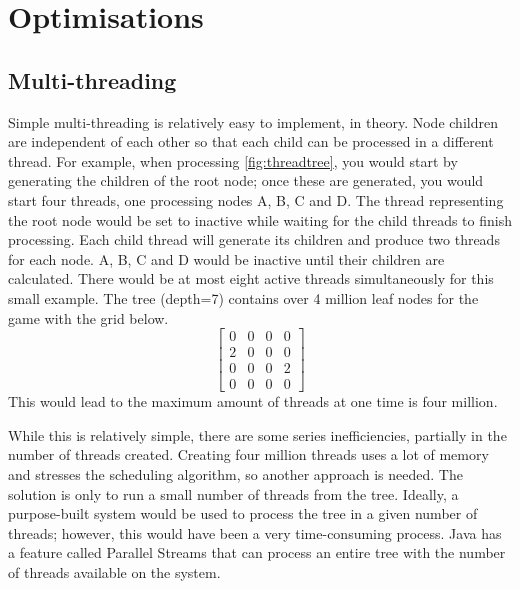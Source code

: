 \documentclass{article}
\begin{document}
\newpage
\section{Optimisations}  
\subsection{Multi-threading}
Simple multi-threading is relatively easy to implement, in theory. Node children are independent of each other so that each child can be processed in a different thread. For example, when processing \ref{fig:threadtree}, you would start by generating the children of the root node; once these are generated, you would start four threads, one processing nodes A, B, C and D. The thread representing the root node would be set to inactive while waiting for the child threads to finish processing. Each child thread will generate its children and produce two threads for each node. A, B, C and D would be inactive until their children are calculated. There would be at most eight active threads simultaneously for this small example. The tree (depth=7) contains over 4 million leaf nodes for the game with the grid below.
$$
\begin{bmatrix}
     0 &0 &0 &0 \\2 &0 &0 &0 \\0 &0 &0 &2 \\0 &0 &0 &0
\end{bmatrix}
$$
This would lead to the maximum amount of threads at one time is four million.

While this is relatively simple, there are some series inefficiencies, partially in the number of threads created. Creating four million threads uses a lot of memory and stresses the scheduling algorithm, so another approach is needed. The solution is only to run a small number of threads from the tree. Ideally, a purpose-built system would be used to process the tree in a given number of threads; however, this would have been a very time-consuming process. Java has a feature called Parallel Streams \cite{pstreams} that can process an entire tree with the number of threads available on the system.
\end{document}

